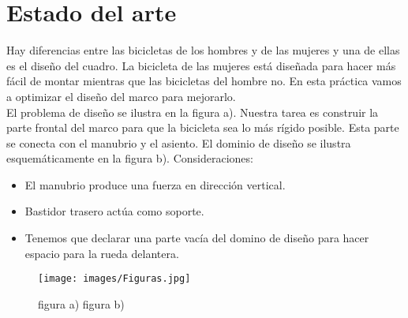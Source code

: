 \documentclass{article}
\begin{document}
\section{Estado del arte}
Hay diferencias entre las bicicletas de los hombres y de las mujeres y una de ellas es el diseño del cuadro. La bicicleta de las mujeres está diseñada para hacer más fácil de montar mientras que las bicicletas del hombre no. En esta práctica vamos a optimizar el diseño del marco para mejorarlo.\cite{ff2}
\\
El problema de diseño se ilustra en la figura a). Nuestra tarea es construir la parte frontal del marco para que la bicicleta sea lo más rígido posible. Esta parte se conecta con el manubrio y el asiento. El dominio de diseño se ilustra esquemáticamente en la figura b).
Consideraciones:
\begin{itemize}
  \item     El manubrio produce una fuerza en dirección vertical. \\
   \item	Bastidor trasero actúa como soporte. \\
   \item	Tenemos que declarar una parte vacía del domino de diseño para hacer espacio para la rueda delantera. \\
\end{itemize}

\begin{figure}[h] %
    \centering
    \texttt{[image: images/Figuras.jpg]} %
    \caption{figura a)       figura b)}
\end{figure}

\newpage
\end{document}
